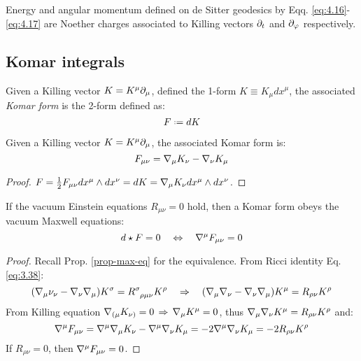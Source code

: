 \begin{example}
  Energy and angular momentum defined on de Sitter geodesics by Eqq. \ref{eq:4.16}-\ref{eq:4.17} are Noether charges associated to Killing vectors $ \partial_t $ and $ \partial_\varphi $ respectively.
\end{example}

\subsection{Komar integrals}

\begin{definition}
  Given a Killing vector $ K = K^\mu \partial_\mu $, defined the 1-form $ K \equiv K_\mu dx^\mu $, the associated \textit{Komar form} is the 2-form defined as:
  \begin{equation}
    F \defeq dK
    \label{eq:4.30}
  \end{equation}
\end{definition}

\begin{proposition}
  Given a Killing vector $ K = K^\mu \partial_\mu $, the associated Komar form is:
  \begin{equation}
    F_{\mu \nu} = \nabla_\mu K_\nu - \nabla_\nu K_\mu
    \label{eq:4.31}
  \end{equation}
\end{proposition}
\begin{proof}
  $ F = \frac{1}{2} F_{\mu \nu} dx^\mu \wedge dx^\nu = dK = \nabla_\mu K_\nu dx^\mu \wedge dx^\nu $.
\end{proof}

\begin{theorem}
  If the vacuum Einstein equations $ R_{\mu \nu} = 0 $ hold, then a Komar form obeys the vacuum Maxwell equations:
  \begin{equation}
    d \star F = 0
    \quad \Leftrightarrow \quad
    \nabla^\mu F_{\mu \nu} = 0
    \label{eq:4.32}
  \end{equation}
\end{theorem}
\begin{proof}
  Recall Prop. \ref{prop-max-eq} for the equivalence. From Ricci identity Eq. \ref{eq:3.38}:
  \begin{equation*}
    (\na_\mu \nu_\nu - \na_\nu \na_\mu) K^\sigma = \tensor{R}{^\sigma_{\rho \mu \nu}} K^\rho
    \quad \Rightarrow \quad
    (\na_\mu \na_\nu - \na_\nu \na_\mu) K^\mu = R_{\rho \nu} K^\rho
  \end{equation*}
  From Killing equation $ \nabla_{(\mu} K_{\nu)} = 0 \,\Rightarrow\, \nabla_\mu K^\mu = 0 $, thus $ \nabla_\mu \nabla_\nu K^\mu = R_{\rho \nu} K^\rho $ and:
  \begin{equation*}
    \nabla^\mu F_{\mu \nu} = \nabla^\mu \nabla_\mu K_\nu - \nabla^\mu \nabla_\nu K_\mu = -2 \nabla^\mu \nabla_\nu K_\mu = -2 R_{\rho \nu} K^\rho
  \end{equation*}
  If $ R_{\rho \nu} = 0 $, then $ \nabla^\mu F_{\mu \nu} = 0 $.
\end{proof}

